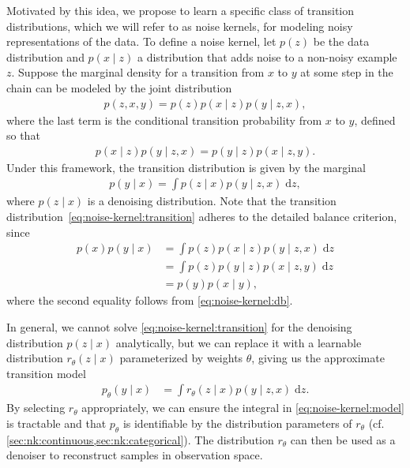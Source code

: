 \documentclass[10pt,twocolumn,letterpaper]{article}
\begin{document}
Motivated by this idea, we propose to learn a specific class of transition distributions, which we will refer to as noise kernels, for modeling noisy representations of the data.
To define a noise kernel, let $p(z)$ be the data distribution and $p(x \mid z)$ a distribution that adds noise to a non-noisy example $z$.
Suppose the marginal density for a transition from $x$ to $y$ at some step in the chain can be modeled by the joint distribution
\begin{align}
  p(z, x, y) = p(z)p(x \mid z)p(y \mid z, x),
\end{align}
where the last term is the conditional transition probability from $x$ to $y$, defined so that
\begin{align}
  p(x \mid z) p(y \mid z, x) = p(y \mid z) p(x \mid z, y).
  \label{eq:noise-kernel:db}
\end{align}
Under this framework, the transition distribution is given by the marginal
\begin{align}
  p(y \mid x) = \int p(z \mid x) p(y \mid z, x) \; \mathrm{d}z,
  \label{eq:noise-kernel:transition}
\end{align}
where $p(z \mid x)$ is a denoising distribution.
Note that the transition distribution~\eqref{eq:noise-kernel:transition} adheres to the detailed balance criterion, since
\begin{align}
  p(x)p(y \mid x)
  & = \int p(z)p(x \mid z)p(y \mid z, x) \; \mathrm{d}z
    \\
  & = \int p(z)p(y \mid z)p(x \mid z, y) \; \mathrm{d}z
    \\
  & = p(y)p(x \mid y),
  \label{eq:noise-kernel:unconditional-db}
\end{align}
where the second equality follows from \cref{eq:noise-kernel:db}.

In general, we cannot solve \cref{eq:noise-kernel:transition} for the denoising distribution $p(z \mid x)$ analytically, but we can replace it with a learnable distribution $r_{\theta}(z \mid x)$ parameterized by weights $\theta$, giving us the approximate transition model
\begin{align}
  p_{\theta}(y \mid x)
  & =
    \int r_{\theta}(z \mid x) p(y \mid z, x) \; \mathrm{d}z
    .
    \label{eq:noise-kernel:model}
\end{align}
By selecting $r_{\theta}$ appropriately, we can ensure the integral in \cref{eq:noise-kernel:model} is tractable and that $p_{\theta}$ is identifiable by the distribution parameters of $r_{\theta}$ (cf. \cref{sec:nk:continuous,sec:nk:categorical}).
The distribution $r_{\theta}$ can then be used as a denoiser to reconstruct samples in observation space.
\end{document}

